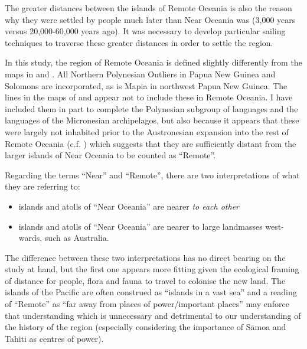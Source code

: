 \documentclass[unnumsec,webpdf,modern,medium]{oup-authoring-template}
\begin{document}
\begin{appendices}
The greater distances between the islands of Remote Oceania is also the reason why they were settled by people much later than Near Oceania was (3,000 years versus 20,000-60,000 years ago). It was necessary to develop particular sailing techniques to traverse these greater distances in order to settle the region.

In this study, the region of Remote Oceania is defined slightly differently from the maps in \citet{green1991near} and \citet{pawley2007locatingoceanic}. All Northern Polynesian Outliers in Papua New Guinea and Solomons are incorporated, as is Mapia in northwest Papua New Guinea. The lines in the maps of \citet{green1991near} and \citet{pawley2007locatingoceanic} appear not to include these in Remote Oceania. I have included them in part to complete the Polynesian subgroup of languages and the languages of the Micronesian archipelagos, but also because it appears that these were largely not inhabited prior to the Austronesian expansion into the rest of Remote Oceania (c.f. \citet[23]{kirch2012basline}) which suggests that they are sufficiently distant from the larger islands of Near Oceania to be counted as ``Remote''.

Regarding the terms ``Near'' and ``Remote'', there are two interpretations of what they are referring to:

\begin{itemize}
    \item islands and atolls of ``Near Oceania'' are nearer \emph{to each other} 
    \item islands and atolls of ``Near Oceania'' are nearer to large landmasses west-wards, such as Australia.
\end{itemize}

The difference between these two interpretations has no direct bearing on the study at hand, but the first one appears more fitting given the ecological framing of distance for people, flora and fauna to travel to colonise the new land. The islands of the Pacific are often construed as ``islands in a vast sea'' \citep{hauofa_1993} and a reading of ``Remote'' as ``far away from places of power/important places'' may enforce that understanding which is unnecessary and detrimental to our understanding of the history of the region (especially considering the importance of S\={a}moa and Tahiti as centres of power). 

\FloatBarrier

\end{appendices}
\end{document}
